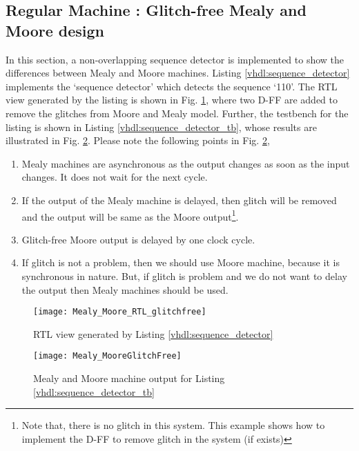 \subsection{Regular Machine : Glitch-free Mealy and Moore design} \label{sec:exampleRegularMMGlitchFree}
In this section, a non-overlapping sequence detector is implemented to show the differences between Mealy and Moore machines. Listing \ref{vhdl:sequence_detector} implements the `sequence detector' which detects the sequence `110'. The RTL view generated by the listing is shown in Fig. \ref{fig:Mealy_Moore_RTL_glitchfree}, where two D-FF are added to remove the glitches from Moore and Mealy model. Further, the testbench for the listing is shown in Listing \ref{vhdl:sequence_detector_tb}, whose results are illustrated in Fig. \ref{fig:Mealy_MooreGlitchFree}. Please note the following points in Fig. \ref{fig:Mealy_MooreGlitchFree},
\begin{enumerate}
	\item Mealy machines are asynchronous as the output changes as soon as the input changes. It does not wait for the next cycle. 
	\item If the output of the Mealy machine is delayed, then glitch will be removed and the output will be same as the Moore output\footnote{Note that, there is no glitch in this system. This example shows how to implement the D-FF to remove glitch in the system (if exists)}. 
	\item Glitch-free Moore output is delayed by one clock cycle. 
	\item If glitch is not a problem, then we should use Moore machine, because it is synchronous in nature. But, if glitch is problem and we do not want to delay the output then Mealy machines should be used. 
\end{enumerate}

\begin{figure}[!h]
	\centering
	\texttt{[image: Mealy\_Moore\_RTL\_glitchfree]}
	\caption{RTL view generated by Listing \ref{vhdl:sequence_detector}}
	\label{fig:Mealy_Moore_RTL_glitchfree}
\end{figure}

\begin{figure}[!h]
	\centering
	\texttt{[image: Mealy\_MooreGlitchFree]}
	\caption{Mealy and Moore machine output for Listing \ref{vhdl:sequence_detector_tb}}
	\label{fig:Mealy_MooreGlitchFree}
\end{figure}




